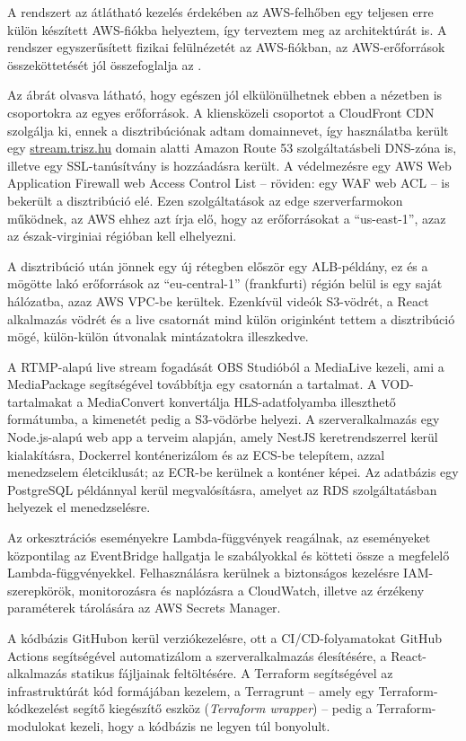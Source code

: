 A rendszert az átlátható kezelés érdekében az AWS-felhőben egy teljesen erre külön készített AWS-fiókba helyeztem, így terveztem meg az architektúrát is. A rendszer egyszerűsített fizikai felülnézetét az AWS-fiókban, az AWS-erőforrások összeköttetését jól összefoglalja az .

Az ábrát olvasva látható, hogy egészen jól elkülönülhetnek ebben a nézetben is csoportokra az egyes erőforrások. A kliensközeli csoportot a CloudFront CDN szolgálja ki, ennek a disztribúciónak adtam domainnevet, így használatba került egy \url{stream.trisz.hu} domain alatti Amazon Route 53 szolgáltatásbeli DNS-zóna is, illetve egy SSL-tanúsítvány is hozzáadásra került. A védelmezésre egy AWS Web Application Firewall web Access Control List -- röviden: egy WAF web ACL -- is bekerült a disztribúció elé. Ezen szolgáltatások az edge szerverfarmokon működnek, az AWS ehhez azt írja elő, hogy az erőforrásokat a ``us-east-1'', azaz az észak-virginiai régióban kell elhelyezni.

A disztribúció után jönnek egy új rétegben először egy ALB-példány, ez és a mögötte lakó erőforrások az ``eu-central-1'' (frankfurti) régión belül is egy saját hálózatba, azaz AWS VPC-be kerültek. Ezenkívül videók S3-vödrét, a React alkalmazás vödrét és a live csatornát mind külön originként tettem a disztribúció mögé, külön-külön útvonalak mintázatokra illeszkedve.

A RTMP-alapú live stream fogadását OBS Studióból a MediaLive kezeli, ami a MediaPackage segítségével továbbítja egy csatornán a tartalmat. A VOD-tartalmakat a MediaConvert konvertálja HLS-adatfolyamba illeszthető formátumba, a kimenetét pedig a S3-vödörbe helyezi. A szerveralkalmazás egy Node.js-alapú web app a terveim alapján, amely NestJS keretrendszerrel kerül kialakításra, Dockerrel konténerizálom és az ECS-be telepítem, azzal menedzselem életciklusát; az ECR-be kerülnek a konténer képei. Az adatbázis egy PostgreSQL példánnyal kerül megvalósításra, amelyet az RDS szolgáltatásban helyezek el menedzselésre.

Az orkesztrációs eseményekre Lambda-függvények reagálnak, az eseményeket központilag az EventBridge hallgatja le szabályokkal és kötteti össze a megfelelő Lambda-függvényekkel. Felhasználásra kerülnek a biztonságos kezelésre IAM-szerepkörök, monitorozásra és naplózásra a CloudWatch, illetve az érzékeny paraméterek tárolására az AWS Secrets Manager.

A kódbázis GitHubon kerül verziókezelésre, ott a CI/CD-folyamatokat GitHub Actions segítségével automatizálom a szerveralkalmazás élesítésére, a React-alkalmazás statikus fájljainak feltöltésére. A Terraform segítségével az infrastruktúrát kód formájában kezelem, a Terragrunt -- amely egy Terraform-kódkezelést segítő kiegészítő eszköz (\emph{Terraform wrapper}) -- pedig a Terraform-modulokat kezeli, hogy a kódbázis ne legyen túl bonyolult.

